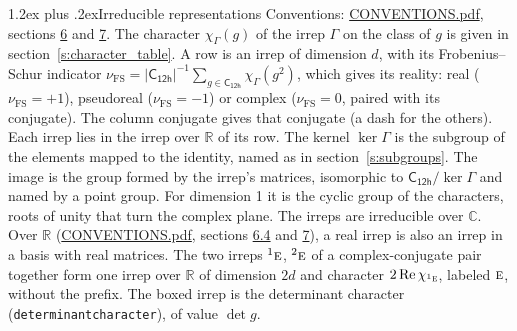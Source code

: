 \documentclass[10pt,a4paper]{article}
\makeatletter
\renewcommand\section{\@startsection{section}{1}{\z@}{-3ex plus -1ex minus -.2ex}%
  {1.2ex plus .2ex}{\normalfont\large\sffamily\bfseries\color{parttitle}}}
\numberwithin{equation}{section}
\newcommand{\grp}[1]{\mathsf{#1}}
\newcommand{\irr}[1]{\text{\normalfont\scshape #1}}
\newcommand{\conjpair}[1]{{}^{#1}}
\newcommand{\irchar}[1]{\chi_{#1}}
\newcommand{\fsind}{\nu_{\mathrm{FS}}}
\makeatother
\begin{document}
\section{Irreducible representations}\label{s:irreps}
Conventions: \href{../../CONVENTIONS.pdf}{CONVENTIONS.pdf}, sections \href{../../CONVENTIONS.pdf\#conv.6}{6} and \href{../../CONVENTIONS.pdf\#conv.7}{7}.
\leavevmode\label{n:function.character}\label{n:irrep.Gamma}The character $\irchar{\Gamma}(g)$ of the irrep $\Gamma$ on the class of $g$ is given in section~\ref{s:character_table}.
\leavevmode\label{n:index.dimension}\label{n:index.frobenius}\label{n:head.irrep}\label{n:head.reality}A row is an irrep of dimension $d$, with its Frobenius--Schur indicator $\fsind = |\grp{C_{12h}}|^{-1}\allowbreak\sum_{g\in\grp{C_{12h}}}\irchar{\Gamma}(g^2)$, which gives its reality: real ($\fsind = +1$), pseudoreal ($\fsind = -1$) or complex ($\fsind = 0$, paired with its conjugate). \label{n:head.conjugate}The column conjugate gives that conjugate (a dash for the others). \label{n:head.over.real}Each irrep lies in the irrep over $\mathbb{R}$ of its row. \label{n:head.kernel}The kernel $\ker\Gamma$ is the subgroup of the elements mapped to the identity, named as in section~\ref{s:subgroups}. \label{n:head.image}The image is the group formed by the irrep's matrices, isomorphic to $\grp{C_{12h}}/\ker\Gamma$ and named by a point group. For dimension 1 it is the cyclic group of the characters, roots of unity that turn the complex plane. The irreps are irreducible over $\mathbb{C}$. Over $\mathbb{R}$ (\href{../../CONVENTIONS.pdf}{CONVENTIONS.pdf}, sections \href{../../CONVENTIONS.pdf\#conv.6.4}{6.4} and \href{../../CONVENTIONS.pdf\#conv.7}{7}), a real irrep is also an irrep in a basis with real matrices. The two irreps $\conjpair{1}\irr{e}$, $\conjpair{2}\irr{e}$ of a complex-conjugate pair together form one irrep over $\mathbb{R}$ of dimension $2d$ and character $2\operatorname{Re}\irchar{\conjpair{1}\irr{e}}$, labeled $\irr{e}$, without the prefix. \label{n:mark.determinant}The boxed irrep is the determinant character (\texttt{determinantcharacter}), of value $\det g$.
\setlength{\emergencystretch}{2em}\par\setlength{\emergencystretch}{0pt}
\end{document}
